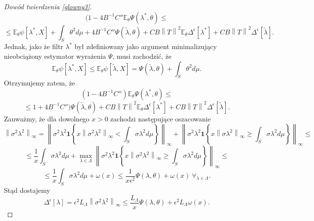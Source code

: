\documentclass{mwart}
\newcommand{\norm}[1]{\left\lVert#1\right\rVert}
\begin{document}
\begin{proof}[Dowód twierdzenia \ref{glowny3}]
\begin{displaymath}
(1-4B^{-1}C''\mathbb{E}_{\theta}\Psi(\lambda^*,\theta)\leq 
\end{displaymath}
\begin{displaymath}
\leq \mathbb{E}_{\theta}\psi[\lambda^*,X]+\int_S\theta ^2d\mu+4B^{-1}C''\Psi(\tilde{\lambda},\theta)+CB\norm{T}^2\mathbb{E}_{\theta}\Delta^{\epsilon}[\lambda^*]+CB\norm{T}^2\Delta^{\epsilon}[\tilde{\lambda}].
\end{displaymath}
Jednak, jako że filtr $\lambda^*$ był zdefiniowany  jako argument minimalizujący nieobciążony estymator wyrażenia $\Psi$, musi zachodzić, że
\begin{displaymath}
\mathbb{E}_{\theta}\psi[\lambda^*,X]\leq \mathbb{E}_{\theta}\psi[\tilde{\lambda},X]=\Psi(\tilde{\lambda},\theta)+\int_S\theta ^2d\mu.
\end{displaymath}
Otrzymujemy zatem, że 
\begin{displaymath}
(1-4B^{-1}C'')\mathbb{E}_{\theta}\Psi(\lambda^*,\theta)\leq 
\end{displaymath}
\begin{displaymath}
\leq 1+4B^{-1}C'')\Psi(\tilde{\lambda},\theta)+CB\norm{T}^2\mathbb{E}_{\theta}\Delta^{\epsilon}[\lambda^*]+CB\norm{T}^2\Delta^{\epsilon}[\tilde{\lambda}].
\end{displaymath}
Zauważmy, że dla dowolnego $x>0$ zachodzi następujące oszacowanie
\begin{displaymath}
\norm{\sigma^2\lambda^2}_{\infty}=\norm{\sigma^2\lambda^2\pmb{1}\left\{x\norm{\sigma^2\lambda^2}_{\infty}<\int_S\sigma\lambda^2 d\mu\right\}}_{\infty}+\norm{\sigma^2\lambda^2\pmb{1}\left\{x\norm{\sigma\lambda^2}_{\infty}\geq \int_S\sigma\lambda^2 d\mu\right\}}_{\infty}\leq
\end{displaymath}
\begin{displaymath}
\leq \frac{1}{x}\int_S\sigma\lambda^2 d\mu+\max_{\lambda\in \Lambda}\norm{\sigma^2\lambda^2\pmb{1}\left\{x\norm{\sigma^2\lambda^2}_{\infty}\geq \int_S\sigma\lambda^2 d\mu\right\}}_{\infty}\leq
\end{displaymath}
\begin{displaymath}
\leq \frac{1}{x}\int_S\sigma\lambda^2 d\mu+\omega (x)\leq \frac{1}{x\epsilon^2}\Psi(\lambda,\theta)+\omega (x)\ \forall_{\lambda\in \Lambda}.
\end{displaymath}
Stąd dostajemy 
\begin{displaymath}
\Delta^{\epsilon}[\lambda]=\epsilon^2 L_{\Lambda}\norm{\sigma^2\lambda^2}_{\infty}\leq \frac{L_{\Lambda}}{x}\Psi(\lambda,\theta)+\epsilon^2L_{\Lambda}\omega (x).

\end{displaymath}
\end{proof}
\end{document}
